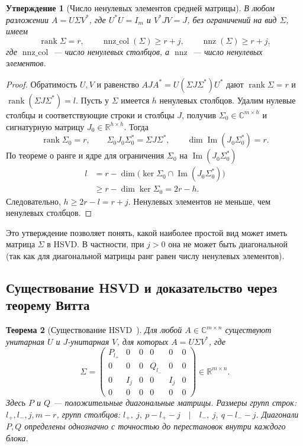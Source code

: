 \documentclass[a4paper,12pt]{article}
\DeclareMathOperator{\rank}{rank}
\theoremstyle{csstyle}
\newtheorem{theorem}{Теорема}[section]
\newtheorem{proposition}[theorem]{Утверждение}
\DeclareMathOperator{\im}{Im}
\newcommand{\R}{\mathbb R}
\newcommand{\HSVDComplex}{\mathbb C}
\begin{document}
\begin{proposition}[Число ненулевых элементов средней матрицы]
\label{rev:prop-sparsity}
В любом разложении $A=U\Sigma V^*$, где $U^*U=I_m$ и
$V^*JV=J$, без ограничений на вид $\Sigma$, имеем
\[
\rank\Sigma=r,\qquad
\operatorname{nnz\_col}(\Sigma)\ge r+j,\qquad
\operatorname{nnz}(\Sigma)\ge r+j,
\]
где $\operatorname{nnz\_col}$ --- число ненулевых столбцов,
а $\operatorname{nnz}$ --- число ненулевых элементов.
\end{proposition}
\begin{proof}
Обратимость $U,V$ и равенство
$AJA^*=U(\Sigma J\Sigma^*)U^*$ дают
$\rank\Sigma=r$ и $\rank(\Sigma J\Sigma^*)=l$.
Пусть у $\Sigma$ имеется $h$ ненулевых столбцов.
Удалим нулевые столбцы и соответствующие строки и столбцы $J$,
получив $\Sigma_0\in\HSVDComplex^{m\times h}$ и сигнатурную
матрицу $J_0\in\mathbb R^{h\times h}$. Тогда
\[
\rank\Sigma_0=r,\qquad
\Sigma_0J_0\Sigma_0^*=\Sigma J\Sigma^*,\qquad
\dim\im(J_0\Sigma_0^*)=r.
\]
По теореме о ранге и ядре для ограничения $\Sigma_0$
на $\im(J_0\Sigma_0^*)$
\[
\begin{aligned}
l&=r-\dim\bigl(\ker\Sigma_0\cap
\im(J_0\Sigma_0^*)\bigr)\\
&\ge r-\dim\ker\Sigma_0=2r-h.
\end{aligned}
\]
Следовательно, $h\ge2r-l=r+j$.
Ненулевых элементов не меньше, чем ненулевых столбцов.
\end{proof}
Это утверждение позволяет понять, какой наиболее простой вид может иметь матрица $\Sigma$ в HSVD. В частности, при $j>0$ она не может быть диагональной (так как для диагональной матрицы ранг равен числу ненулевых элементов).

\subsection{Существование HSVD и доказательство через теорему Витта}
\label{sec:existence-witt}

\begin{theorem}[Существование HSVD~\cite{Shirokov}]\label{th:hsvd}
Для любой $A\in\HSVDComplex^{m\times n}$ существуют унитарная $U$
и $J$-унитарная $V$, для которых $A=U\Sigma V^*$,
где 
\begin{equation}\label{eq:canonical}
\Sigma=
\left(\begin{array}{ccc|ccc}
P_{l_+}&0&0&0&0&0\\
0&0&0&Q_{l_-}&0&0\\
0&I_j&0&0&I_j&0\\
0&0&0&0&0&0
\end{array}\right)\in\R^{m\times n}.
\end{equation}
Здесь $P$ и $Q$ --- положительные диагональные матрицы.
Размеры групп строк: $l_+,l_-,j,m-r$, групп столбцов: $l_+,\ j,\ p-l_+-j\quad\big|\quad l_-,\ j,\ q-l_--j$.
Диагонали $P,Q$ определены однозначно с точностью до перестановок внутри каждого блока.
\end{theorem}
\end{document}
